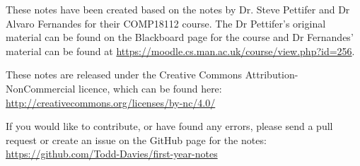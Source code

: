 \documentclass{article}
\begin{document}

These notes have been created based on the notes by Dr. Steve Pettifer and Dr
Alvaro Fernandes for their COMP18112 course. The Dr Pettifer's original material
can be found on the Blackboard page for the course and Dr Fernandes' material
can be found at \url{https://moodle.cs.man.ac.uk/course/view.php?id=256}.

These notes are released under the Creative Commons Attribution-NonCommercial
licence, which can be found here:
\url{http://creativecommons.org/licenses/by-nc/4.0/}

If you would like to contribute, or have found any errors, please send a pull
request or create an issue on the GitHub page for the notes:
\url{https://github.com/Todd-Davies/first-year-notes}
\end{document}
